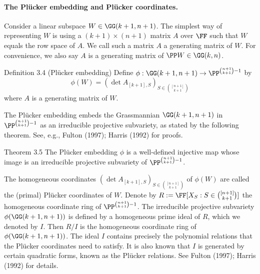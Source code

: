 \paragraph{The Pl\"ucker embedding and Pl\"ucker coordinates.}
Consider a linear subspace $W\in\GG(k+1,n+1)$. The simplest way of representing $W$ is using a $(k+1)\times(n+1)$ matrix $A$ over $\FF$ such that $W$ equals the row space of $A$. We call such a matrix $A$ a generating matrix of $W$. For convenience, we also say $A$ is a generating matrix of $\PP W\in\GG(k,n)$.
\begin{result}{Definition 3.4 (Pl\"ucker embedding)}
Define $\phi:\GG(k+1,n+1)\to\PP^{\binom{n+1}{k+1}-1}$ by
\[\phi(W)=(\det A_{[k+1],S})_{S\in\binom{[n+1]}{k+1}}\]
where $A$ is a generating matrix of $W$.
\end{result}
The Pl\"ucker embedding embeds the Grassmannian $\GG(k+1,n+1)$ in $\PP^{\binom{n+1}{k+1}-1}$ as an irreducible projective subvariety, as stated by the following theorem. See, e.g., Fulton (1997); Harris (1992) for proofs.
\begin{result}{Theorem 3.5}
The Pl\"ucker embedding $\phi$ is a well-defined injective map whose image is an irreducible projective subvariety of $\PP^{\binom{n+1}{k+1}-1}$.
\end{result}
The homogeneous coordinates $(\det A_{[k+1],S})_{S\in\binom{[n+1]}{k+1}}$ of $\phi(W)$ are called the (primal) Pl\"ucker coordinates of $W$.
Denote by $R:=\FF[X_S:S\in\binom{[n+1]}{k+1}]$ the homogeneous coordinate ring of $\PP^{\binom{n+1}{k+1}-1}$. The irreducible projective subvariety $\phi(\GG(k+1,n+1))$ is defined by a homogeneous prime ideal of $R$, which we denoted by $I$. Then $R/I$ is the homogeneous coordinate ring of $\phi(\GG(k+1,n+1))$. The ideal $I$ contains precisely the polynomial relations that the Pl\"ucker coordinates need to satisfy. It is also known that $I$ is generated by certain quadratic forms, known as the Pl\"ucker relations. See Fulton (1997); Harris (1992) for details.
